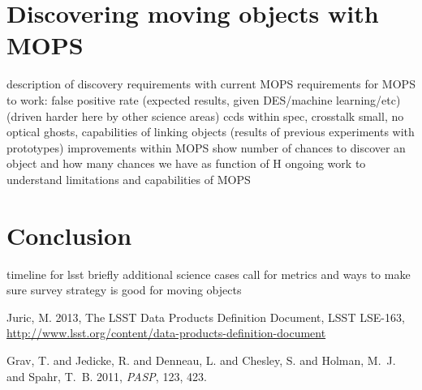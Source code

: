 \documentclass{iau}
\begin{document}
\section{Discovering moving objects with MOPS}
description of discovery requirements with current MOPS
requirements for MOPS to work:
 false positive rate (expected results, given DES/machine
 learning/etc) (driven harder here by other science areas)
   ccds within spec, crosstalk small, no optical ghosts, 
 capabilities of linking objects (results of previous experiments with
 prototypes)  improvements within MOPS
show number of chances to discover an object and how many chances we
have as function of H 
ongoing work to understand limitations and capabilities of MOPS

\section{Conclusion}
timeline for lsst
briefly additional science cases
call for metrics and ways to make sure survey strategy is good for
moving objects



\begin{thebibliography}{}

{Juric, M.} 2013, The LSST Data Products Definition Document, LSST LSE-163,
\url{http://www.lsst.org/content/data-products-definition-document}

 {{Grav}, T. and {Jedicke}, R. and {Denneau}, L. and {Chesley}, S. and 
	{Holman}, M.~J. and {Spahr}, T.~B.} 2011, \textit{PASP}, 123, 423.




\end{thebibliography}

\end{document}
